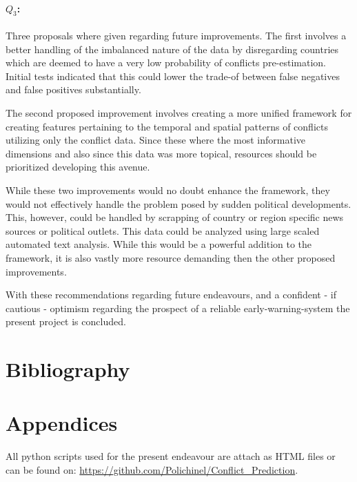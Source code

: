 \documentclass[a4paper]{article}
\begin{document}
\paragraph{$Q_3$:} Three proposals where given regarding future improvements. The first involves a better handling of the imbalanced nature of the data by disregarding countries which are deemed to have a very low probability of conflicts pre-estimation. Initial tests indicated that this could lower the trade-of between false negatives and false positives substantially.\par

The second proposed improvement involves creating a more unified framework for creating features pertaining to the temporal and spatial patterns of conflicts utilizing only the conflict data. Since these where the most informative dimensions and also since this data was more topical, resources should be prioritized developing this avenue.\par

While these two improvements would no doubt enhance the framework, they would not effectively handle the problem posed by sudden political developments. This, however, could be handled by scrapping of country or region specific news sources or political outlets. This data could be analyzed using large scaled automated text analysis. While this would be a powerful addition to the framework, it is also vastly more resource demanding then the other proposed improvements.\par

With these recommendations regarding future endeavours, and a confident - if cautious - optimism regarding the prospect of a reliable early-warning-system the present project is concluded.\par

\pagebreak

\section{Bibliography}
 


\pagebreak
\section{Appendices}

All python scripts used for the present endeavour are attach as HTML files or can be found on: \hyperlink{https://github.com/Polichinel/Conflict_Prediction}{https://github.com/Polichinel/Conflict\_Prediction}.\par
\end{document}
